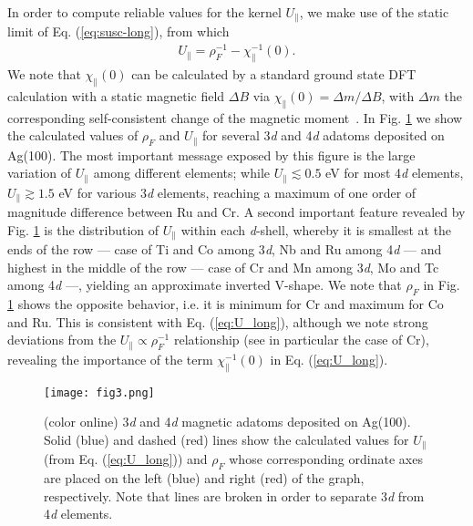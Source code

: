 \documentclass[prb,footinbib,showpacs,twocolumn,amsmath,amssymb]{revtex4}
\newcommand{\bek}{\begin{eqnarray}}
\newcommand{\ek}{\end{eqnarray}}
\begin{document}
In order to compute reliable values for the
kernel $U_{\parallel}$, we make use of 
the static limit of Eq. (\ref{eq:susc-long}), from which
\bek\label{eq:U_long}
U_{\parallel} = \rho_{F}^{-1}-\chi^{-1}_{\parallel}(0).
\ek
We note that $\chi_{\parallel}(0)$ can be calculated by a standard ground state DFT calculation
with a static magnetic field $\Delta B$ via $\chi_{\parallel}(0)=\Delta m /\Delta B$,
with $\Delta m$ the corresponding self-consistent change of the magnetic moment~\cite{kubler_theory_2009}. 
In Fig. \ref{fig:Udotrho} we show the calculated values of $\rho_{F}$ and $U_{\parallel}$
for  several 3\textit{d} and 4\textit{d} adatoms deposited on
Ag(100). The most important message exposed by this figure is the large variation
of $U_{\parallel}$ among different elements; while  $U_{\parallel}\lesssim 0.5$ eV
for most 4\textit{d} elements, $U_{\parallel}\gtrsim 1.5$ eV for various 3\textit{d} elements,
reaching a maximum of one order of magnitude difference between Ru and Cr. 
A second important feature revealed by Fig. \ref{fig:Udotrho} 
is the distribution of $U_{\parallel}$ within each \textit{d}-shell, whereby
it is smallest at the ends of the row  
--- case of Ti and Co among 3\textit{d}, Nb and Ru among 4\textit{d} --- 
and highest in the middle of the row 
--- case of Cr and Mn among 3\textit{d}, Mo and Tc among 4\textit{d} ---,
yielding an approximate inverted V-shape.
We note that $\rho_{F}$ in Fig. \ref{fig:Udotrho} shows the opposite behavior, 
i.e. it is minimum for Cr and maximum for Co and Ru.
This is consistent with Eq. (\ref{eq:U_long}), although we note strong deviations
from the $U_{\parallel}\propto \rho_{F}^{-1}$ relationship 
(see in particular the case of Cr), 
revealing the importance
of the term $\chi^{-1}_{\parallel}(0)$ in Eq. (\ref{eq:U_long}).








\begin{figure}[t]
\texttt{[image: fig3.png]}
\caption{(color online) 3\textit{d} and 4\textit{d} magnetic adatoms deposited on Ag(100). 
Solid (blue) and dashed (red) lines show the 
calculated values for $U_{\parallel}$ (from Eq. (\ref{eq:U_long})) and 
$\rho_{F}$
whose corresponding ordinate axes are placed on the left (blue) and right (red)
of the graph, respectively. Note that lines are broken in order to separate
3\textit{d} from 4\textit{d} elements.
}
\label{fig:Udotrho}
\end{figure}
\end{document}
